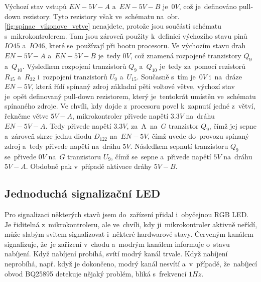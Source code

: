 Výchozí stav vstupů \(EN-5V-A\) a~\(EN-5V-B\) je~\(0 V\), což je~definováno pull-down rezistory.
Tyto rezistory však ve~schématu na~obr.\ref{fig:spinac_vikonove_vetve} nenajdete, protože jsou součástí schématu s~mikrokontrolerem.
Tam jsou zároveň použity k~definici výchozího stavu pinů \(IO45\) a~\(IO46\), které se~používají při bootu procesoru.
Ve výchozím stavu drah \(EN-5V-A\) a~\(EN-5V-B\) je~tedy \(0 V\), což znamená rozpojené tranzistory \(Q_9\) a~\(Q_{10}\).
Výsledkem rozpojení tranzistorů \(Q_9\) a~\(Q_{10}\) je~tedy za~pomocí rezistorů \(R_15\) a~\(R_{32}\) i~rozpojení tranzistorů \(U_{9}\) a~\(U_{15}\).
Současně s~tím je~\(0V\) i~na~dráze \(EN-5V\), která řídí spínaný zdroj základní pěti voltové větve, výchozí stav je~opět definovaný pull-down rezistorem, který je~tentokrát umístěn ve~schématu spínaného zdroje.
Ve chvíli, kdy dojde z~procesoru povel k~zapnutí jedné z~větví, řekněme větve \(5V-A\), mikrokontroler přivede napětí \(3.3 V\) na~dráhu \(EN-5V-A\).
Tedy přivede napětí \(3.3 V\), za~A~na~\(G\) tranzistor \(Q_9\), čímž jej sepne a~zároveň skrze jednu diodu \(D_{122}\) na~\(EN-5V\), čímž uvede do~provozu spínaný zdroj a~tedy přivede napětí na~dráhu \(5V\).
Následkem sepnutí tranzistoru \(Q_9\) se~přivede \(0 V\) na~\(G\) tranzistoru \(U_{9}\), čímž se~sepne a~přivede napětí \(5V\) na~dráhu \(5V-A\).
Obdobně pak v~případě aktivace dráhy \(5V-B\).


\subsection{Jednoduchá signalizační LED}

Pro signalizaci některých stavů jsem do~zařízení přidal i~obyčejnou RGB LED.
Je řiditelná z~mikrokontroleru, ale ve~chvíli, kdy ji~mikrokontroler aktivně neřídí, může slabým svitem signalizovat i~některé hardwarové stavy.
Červeným kanálem signalizuje, že~je zařízení v~chodu a~modrým kanálem informuje o~stavu nabíjení.
Když nabíjení probíhá, svítí modrý kanál trvale.
Když nabíjení neprobíhá, např. když je dokončeno, modrý kanál nesvítí a~v~případě, že~nabíjecí obvod BQ25895 \cite{BQ25895} detekuje nějaký problém, bliká s~frekvencí \(1 Hz\).

